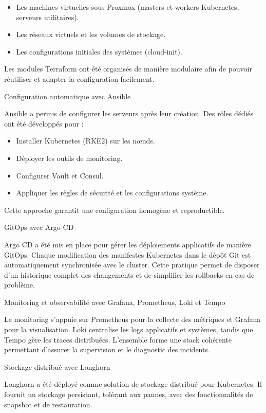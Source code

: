 \begin{itemize}
	\item Les machines virtuelles sous Proxmox (masters et workers Kubernetes, serveurs utilitaires).
	\item Les réseaux virtuels et les volumes de stockage.
	\item Les configurations initiales des systèmes (cloud-init).
\end{itemize}

Les modules Terraform ont été organisés de manière modulaire afin de pouvoir réutiliser et adapter la configuration facilement.

	{Configuration automatique avec Ansible}

Ansible a permis de configurer les serveurs après leur création. Des rôles dédiés ont été développés pour :

\begin{itemize}
	\item Installer Kubernetes (RKE2) sur les nœuds.
	\item Déployer les outils de monitoring.
	\item Configurer Vault et Consul.
	\item Appliquer les règles de sécurité et les configurations système.
\end{itemize}

Cette approche garantit une configuration homogène et reproductible.

	{GitOps avec Argo CD}

Argo CD a été mis en place pour gérer les déploiements applicatifs de manière GitOps. Chaque modification des manifestes Kubernetes dans le dépôt Git est automatiquement synchronisée avec le cluster. Cette pratique permet de disposer d’un historique complet des changements et de simplifier les rollbacks en cas de problème.

{Monitoring et observabilité avec Grafana, Prometheus, Loki et Tempo}

Le monitoring s’appuie sur Prometheus pour la collecte des métriques et Grafana pour la visualisation. Loki centralise les logs applicatifs et systèmes, tandis que Tempo gère les traces distribuées. L’ensemble forme une stack cohérente permettant d’assurer la supervision et le diagnostic des incidents.

	{Stockage distribué avec Longhorn}

Longhorn a été déployé comme solution de stockage distribué pour Kubernetes. Il fournit un stockage persistant, tolérant aux pannes, avec des fonctionnalités de snapshot et de restauration.

